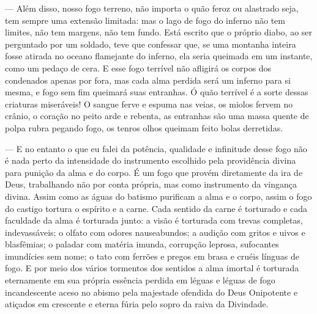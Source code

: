  --- Além disso, nosso fogo terreno, não importa o quão feroz ou alastrado
seja, tem sempre uma extensão limitada: mas o lago de fogo do inferno
não tem limites, não tem margens, não tem fundo. Está escrito que o
próprio diabo, ao ser perguntado por um soldado, teve que confessar
que, se uma montanha inteira fosse atirada no oceano flamejante do
inferno, ela seria queimada em um instante, como um pedaço de cera. E
esse fogo terrível não afligirá os corpos dos condenados apenas por
fora, mas cada alma perdida será um inferno para si mesma, e fogo sem
fim queimará suas entranhas. Ó quão terrível é a sorte dessas criaturas
miseráveis! O sangue ferve e espuma nas veias, os miolos fervem no
crânio, o coração no peito arde e rebenta, as entranhas são uma massa
quente de polpa rubra pegando fogo, os tenros olhos queimam feito bolas
derretidas.

 --- E no entanto o que eu falei da potência, qualidade e infinitude desse
fogo não é nada perto da intensidade do instrumento escolhido pela
providência divina para punição da alma e do corpo. É um fogo que
provém diretamente da ira de Deus, trabalhando não por conta própria,
mas como instrumento da vingança divina. Assim como as águas do batismo
purificam a alma e o corpo, assim o fogo do castigo tortura o espírito
e a carne. Cada sentido da carne é torturado e cada faculdade da alma é
torturada junto: a visão é torturada com trevas completas,
indevassáveis; o olfato com odores nauseabundos; a audição com gritos e
uivos e blasfêmias; o paladar com matéria imunda, corrupção leprosa,
sufocantes imundícies sem nome; o tato com ferrões e pregos em brasa e
cruéis línguas de fogo. E por meio dos vários tormentos dos sentidos a
alma imortal é torturada eternamente em sua própria essência perdida em
léguas e léguas de fogo incandescente aceso no abismo pela majestade
ofendida do Deus Onipotente e atiçados em crescente e eterna fúria pelo
sopro da raiva da Divindade.

